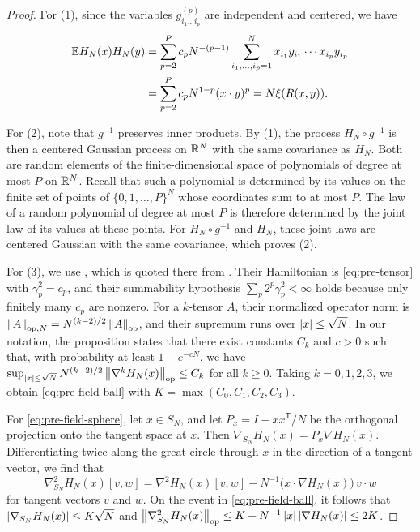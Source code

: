 \begin{proof}
For (1), since the variables $g^{(p)}_{i_1\dots i_p}$ are independent and centered, we have
\[
\begin{split}
\mathbb E H_N(x)H_N(y)&=\sum_{p=2}^Pc_pN^{-(p-1)}\sum_{i_1,\dots,i_p=1}^Nx_{i_1}y_{i_1}\cdots x_{i_p}y_{i_p}\\
&=\sum_{p=2}^Pc_pN^{1-p}(x\cdot y)^p=N\xi(R(x,y)).
\end{split}
\]

For (2), note that $g^{-1}$ preserves inner products. By (1), the process $H_N\circ g^{-1}$ is then a centered Gaussian process on $\mathbb R^N$ with the same covariance as $H_N$. Both are random elements of the finite-dimensional space of polynomials of degree at most $P$ on $\mathbb R^N$. Recall that such a polynomial is determined by its values on the finite set of points of $\{0,1,\dots,P\}^N$ whose coordinates sum to at most $P$. The law of a random polynomial of degree at most $P$ is therefore determined by the joint law of its values at these points. For $H_N\circ g^{-1}$ and $H_N$, these joint laws are centered Gaussian with the same covariance, which proves (2).

For (3), we use \cite[Proposition~3.6]{HuangMontanariPham2024}, which is quoted there from \cite{HuangSellke2025}. Their Hamiltonian \cite[(1.1)]{HuangMontanariPham2024} is \eqref{eq:pre-tensor} with $\gamma_p^2=c_p$, and their summability hypothesis $\sum_p2^p\gamma_p^2<\infty$ holds because only finitely many $c_p$ are nonzero. For a $k$-tensor $A$, their normalized operator norm is $\left\lVert A\right\rVert_{{\rm op},N}=N^{(k-2)/2}\left\lVert A\right\rVert_{\rm op}$, and their supremum runs over $\left|x\right|\le\sqrt N$. In our notation, the proposition states that there exist constants $C_k$ and $c>0$ such that, with probability at least $1-e^{-cN}$, we have $\sup_{\left|x\right|\le\sqrt N}N^{(k-2)/2}\left\lVert\nabla^kH_N(x)\right\rVert_{\rm op}\le C_k$ for all $k\ge0$. Taking $k=0,1,2,3$, we obtain \eqref{eq:pre-field-ball} with $K=\max(C_0,C_1,C_2,C_3)$.

For \eqref{eq:pre-field-sphere}, let $x\in S_N$, and let $P_x=I-xx^{\mathsf T}/N$ be the orthogonal projection onto the tangent space at $x$. Then $\nabla_{S_N}H_N(x)=P_x\nabla H_N(x)$. Differentiating twice along the great circle through $x$ in the direction of a tangent vector, we find that
\[
\nabla^2_{S_N}H_N(x)[v,w]=\nabla^2H_N(x)[v,w]-N^{-1}\big(x\cdot\nabla H_N(x)\big)\,v\cdot w
\]
for tangent vectors $v$ and $w$. On the event in \eqref{eq:pre-field-ball}, it follows that $\left|\nabla_{S_N}H_N(x)\right|\le K\sqrt N$ and $\left\lVert\nabla^2_{S_N}H_N(x)\right\rVert_{\rm op}\le K+N^{-1}\left|x\right|\left|\nabla H_N(x)\right|\le2K$.
\end{proof}

